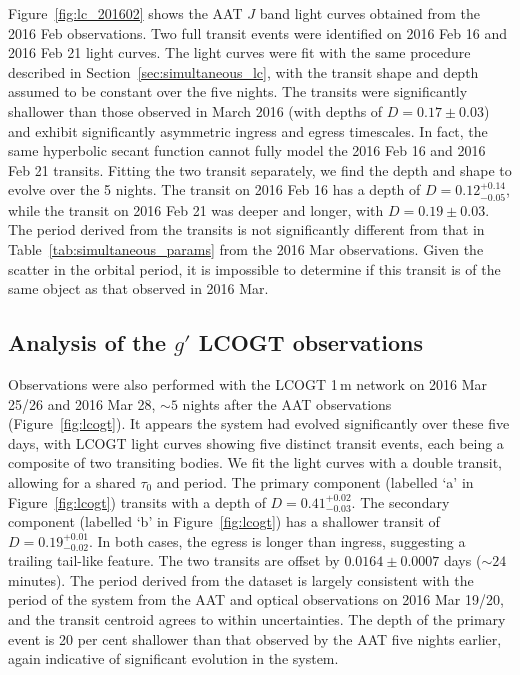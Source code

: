 \documentclass[useAMS,usenatbib]{mn2e}
\begin{document}
Figure~\ref{fig:lc_201602} shows the AAT $J$ band light curves obtained from the 2016 Feb observations. Two full transit events were identified on 2016 Feb 16 and 2016 Feb 21 light curves. The light curves were fit with the same procedure described in Section~\ref{sec:simultaneous_lc}, with the transit shape and depth assumed to be constant over the five nights. The transits were significantly shallower than those observed in March 2016 (with depths of $D=0.17\pm0.03$) and exhibit significantly asymmetric ingress and egress timescales. In fact, the same hyperbolic secant function cannot fully model the 2016 Feb 16 and 2016 Feb 21 transits. Fitting the two transit separately, we find the depth and shape to evolve over the 5 nights. The transit on 2016 Feb 16 has a depth of $D = 0.12_{-0.05}^{+0.14}$, while the transit on 2016 Feb 21 was deeper and longer, with $D = 0.19\pm0.03$. The period derived from the transits is not significantly different from that in Table~\ref{tab:simultaneous_params} from the 2016 Mar observations. Given the scatter in the orbital period, it is impossible to determine if this transit is of the same object as that observed in 2016 Mar.

\subsection{Analysis of the $g'$ LCOGT observations}
\label{sec:single_band_LCOGT}


Observations were also performed with the LCOGT 1\,m network on 2016 Mar 25/26 and 2016 Mar 28, $\sim 5$ nights after the AAT observations (Figure~\ref{fig:lcogt}). It appears the system had evolved significantly over these five days, with LCOGT light curves showing five distinct transit events, each being a composite of two transiting bodies. We fit the light curves with a double transit, allowing for a shared $\tau_0$ and period. The primary component (labelled `a' in Figure~\ref{fig:lcogt}) transits with a depth of $D = 0.41_{-0.03}^{+0.02}$. The secondary component (labelled `b' in Figure~\ref{fig:lcogt}) has a shallower transit of $D = 0.19_{-0.02}^{+0.01}$. In both cases, the egress is longer than ingress, suggesting a trailing tail-like feature. The two transits are offset by $0.0164 \pm 0.0007$ days ($\sim 24$ minutes). The period derived from the dataset is largely consistent with the period of the system from the AAT and optical observations on 2016 Mar 19/20, and the transit centroid agrees to within uncertainties. The depth of the primary event is 20 per cent shallower than that observed by the AAT five nights earlier, again indicative of significant evolution in the system. 
\end{document}
